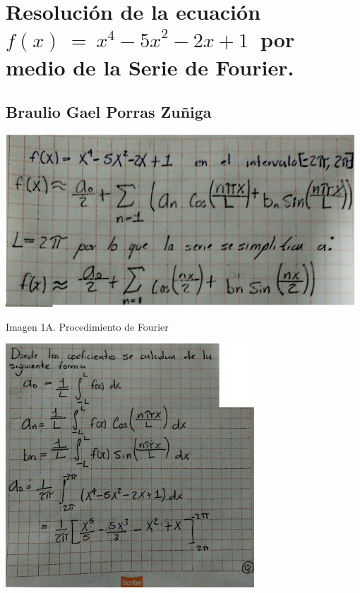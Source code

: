 \section{\texorpdfstring{Resolución de la ecuación \(f(x)\  = \ x^{4} - {5x}^{2} - 2x + 1\ \) por medio de la Serie de Fourier.}{Resolución de la ecuación f(x)\textbackslash{}  = \textbackslash{} x\^{}\{4\} - \{5x\}\^{}\{2\} - 2x + 1\textbackslash{}  por medio de la Serie de Fourier.}}\label{resoluciuxf3n-de-la-ecuaciuxf3n-fx-x4---5x2---2x-1-por-medio-de-la-serie-de-fourier.}

\subsection{\texorpdfstring{Braulio Gael Porras Zuñiga }{Braulio Gael Porras Zuñiga }}\label{braulio-gael-porras-zuuxf1iga}

\includegraphics[width=5.15104in,height=2.54129in]{media/image52.png}

Imagen 1A. Procedimiento de Fourier

\includegraphics[width=3.66667in,height=3.60643in]{media/image49.png}

